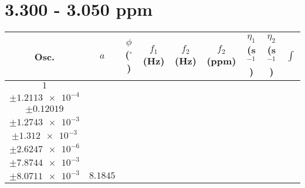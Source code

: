 \documentclass[8pt]{article}
\begin{document}
\section*{3.300 - 3.050 ppm}
\begin{longtable}[l]{c c c c c c c c c}
\toprule
Osc. & $a$ & $\phi$ ($^{\circ}$) & $f_1$ (Hz) & $f_2$ (Hz) & $f_2$ (ppm) & $\eta_1$ (s$^{-1}$) & $\eta_2$ (s$^{-1}$) & $\int$\\
\midrule
$\num{1}$ & \begin{tabular}[c]{@{}c@{}}$\num{5.9442e-2}$ \\ $\pm\num{1.2113e-4}$\end{tabular} & \begin{tabular}[c]{@{}c@{}}$\num{-0.61249}$ \\ $\pm\num{0.12019}$\end{tabular} & \begin{tabular}[c]{@{}c@{}}$\num{-10.341}$ \\ $\pm\num{1.2743e-3}$\end{tabular} & \begin{tabular}[c]{@{}c@{}}$\num{1.5555e+3}$ \\ $\pm\num{1.312e-3}$\end{tabular} & \begin{tabular}[c]{@{}c@{}}$\num{3.1118}$ \\ $\pm\num{2.6247e-6}$\end{tabular} & \begin{tabular}[c]{@{}c@{}}$\num{3.338}$ \\ $\pm\num{7.8744e-3}$\end{tabular} & \begin{tabular}[c]{@{}c@{}}$\num{3.4308}$ \\ $\pm\num{8.0711e-3}$\end{tabular} & $\num{8.1845}$\\

\end{longtable}
\end{document}
